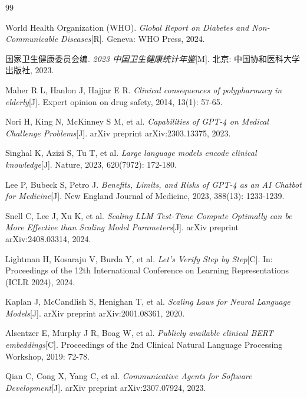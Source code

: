 \documentclass[11pt,a4paper]{ctexart}
\begin{document}
\newpage
\renewcommand{\refname}{参考文献}
\begin{thebibliography}{99}
\small %

World Health Organization (WHO).
\emph{Global Report on Diabetes and Non-Communicable Diseases}[R].
Geneva: WHO Press, 2024.

国家卫生健康委员会编.
\emph{2023 中国卫生健康统计年鉴}[M].
北京: 中国协和医科大学出版社, 2023.

Maher R L, Hanlon J, Hajjar E R.
\emph{Clinical consequences of polypharmacy in elderly}[J].
Expert opinion on drug safety, 2014, 13(1): 57-65.

Nori H, King N, McKinney S M, et al.
\emph{Capabilities of GPT-4 on Medical Challenge Problems}[J].
arXiv preprint arXiv:2303.13375, 2023.

Singhal K, Azizi S, Tu T, et al.
\emph{Large language models encode clinical knowledge}[J].
Nature, 2023, 620(7972): 172-180.

Lee P, Bubeck S, Petro J.
\emph{Benefits, Limits, and Risks of GPT-4 as an AI Chatbot for Medicine}[J].
New England Journal of Medicine, 2023, 388(13): 1233-1239.

Snell C, Lee J, Xu K, et al.
\emph{Scaling LLM Test-Time Compute Optimally can be More Effective than Scaling Model Parameters}[J].
arXiv preprint arXiv:2408.03314, 2024.

Lightman H, Kosaraju V, Burda Y, et al.
\emph{Let's Verify Step by Step}[C].
In: Proceedings of the 12th International Conference on Learning Representations (ICLR 2024), 2024.

Kaplan J, McCandlish S, Henighan T, et al.
\emph{Scaling Laws for Neural Language Models}[J].
arXiv preprint arXiv:2001.08361, 2020.

Alsentzer E, Murphy J R, Boag W, et al.
\emph{Publicly available clinical BERT embeddings}[C].
Proceedings of the 2nd Clinical Natural Language Processing Workshop, 2019: 72-78.

Qian C, Cong X, Yang C, et al.
\emph{Communicative Agents for Software Development}[J].
arXiv preprint arXiv:2307.07924, 2023.


\end{thebibliography}
\end{document}
